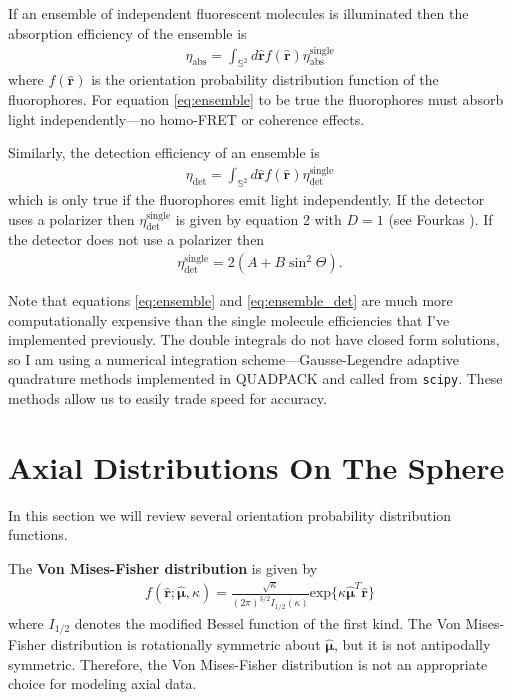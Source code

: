 \documentclass[11pt]{article}
\providecommand{\mh}[1]{\mathbf{\hat{#1}}}
\providecommand{\bs}[1]{\boldsymbol{#1}}
\begin{document}
If an ensemble of independent fluorescent molecules is illuminated then the
absorption efficiency of the ensemble is
\begin{align}
  \eta_{\text{abs}} = \int_{\mathbb{S}^2}d\mh{r} f(\mh{r}) \eta_{\text{abs}}^{\text{single}} \label{eq:ensemble}%
\end{align} 
where $f(\mh{r})$ is the orientation probability distribution function of the
fluorophores. For equation \ref{eq:ensemble} to be true the fluorophores must
absorb light independently---no homo-FRET or coherence effects.

Similarly, the detection efficiency of an ensemble is
\begin{align}
  \eta_{\text{det}} = \int_{\mathbb{S}^2}d\mh{r} f(\mh{r}) \eta_{\text{det}}^{\text{single}} \label{eq:ensemble_det}%
\end{align} 
which is only true if the fluorophores emit light independently. If the detector
uses a polarizer then $\eta_{\text{det}}^{\text{single}}$ is given by equation 2 with $D = 1$ (see Fourkas \cite{fourkas2001}). If the detector does not use a polarizer then
\begin{align}
  \eta_{\text{det}}^{\text{single}} = 2(A + B\sin^2\Theta).
\end{align}

Note that equations \ref{eq:ensemble} and \ref{eq:ensemble_det} are much more
computationally expensive than the single molecule efficiencies that I've
implemented previously. The double integrals do not have closed form solutions,
so I am using a numerical integration scheme---Gausse-Legendre adaptive
quadrature methods implemented in QUADPACK and called from \texttt{scipy}. These
methods allow us to easily trade speed for accuracy.

\section{Axial Distributions On The Sphere}
In this section we will review several orientation probability distribution functions. 

The \textbf{Von Mises-Fisher distribution} is given by
\begin{align*}
  f(\mh{r}; \bs{\hat{\mu}}, \kappa) = \frac{\sqrt{\kappa}}{(2\pi{})^{3/2}I_{1/2}(\kappa)}\text{exp}\{\kappa \bs{\hat{\mu}}^T\mh{r}\}
\end{align*}
where $I_{1/2}$ denotes the modified Bessel function of the first kind. The Von
Mises-Fisher distribution is rotationally symmetric about $\bs{\hat{\mu}}$, but
it is not antipodally symmetric. Therefore, the Von Mises-Fisher distribution is
not an appropriate choice for modeling axial data.
\end{document}
